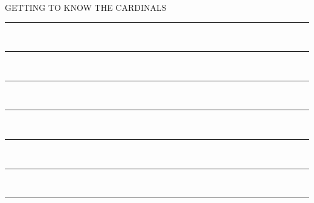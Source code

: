 \documentclass[a4paper, 11pt, oneside]{book} %
\begin{document}
\begin{titlepage}
	
	\vspace{\baselineskip} %
	
	{\LARGE GETTING TO KNOW THE CARDINALS\\} %
	
	\vspace{0.75\baselineskip} %
	
	
	

	\rule{7cm}{0.4pt} \\ \vspace*{-\baselineskip}\vspace*{4.2pt}
	\rule{8cm}{0.6pt} \\ \vspace*{-\baselineskip}\vspace*{4.4pt}
	\rule{9cm}{0.8pt} \\ \vspace*{-\baselineskip}\vspace*{4.6pt}
	\rule{10cm}{1.0pt} \\ \vspace*{-\baselineskip}\vspace*{4.8pt}
	\rule{11cm}{1.2pt} \\ \vspace*{-\baselineskip}\vspace*{5.0pt}
	\rule{12cm}{1.4pt} \\ \vspace*{-\baselineskip}\vspace*{5.2pt}
	\rule{\textwidth}{1.6pt} %
	

\end{titlepage}
\end{document}
